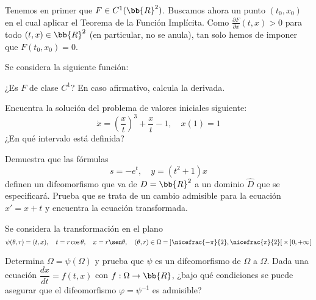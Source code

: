 \documentclass[12pt]{article}
\begin{document}
\begin{ejercicio}
\begin{description}
            Tenemos en primer que $F\in C^1(\bb{R}^2)$. Buscamos ahora un punto $(t_0, x_0)$ en el cual aplicar el Teorema de la Función Implícita. Como $\frac{\partial F}{\partial x} (t, x) > 0$ para todo $(t, x)\in\bb{R}^2$ (en particular, no se anula),
            tan solo hemos de imponer que $F(t_0, x_0) = 0$.
        \end{description}



    \end{ejercicio}


\begin{ejercicio}
    Se considera la siguiente función:
    \Func{F}{]0, +\infty[}{\bb{R}}{t}{\int_0^{\sqrt{t}} e^{s^2} ~ds}

    ¿Es $F$ de clase $C^1$? En caso afirmativo, calcula la derivada.
\end{ejercicio}


\begin{ejercicio}
    Encuentra la solución del problema de valores iniciales siguiente:
    \begin{equation*}
        \dot{x} = \left(\dfrac{x}{t}\right)^3 + \dfrac{x}{t} - 1, \quad x(1) = 1
    \end{equation*}
    ¿En qué intervalo está definida?
\end{ejercicio}


\begin{ejercicio}
    Demuestra que las fórmulas
    \begin{equation*}
        s = -e^t, \quad y = (t^2 + 1)x
    \end{equation*}
    definen un difeomorfismo que va de $D = \bb{R}^2$ a un dominio $\hat{D}$ que se especificará.
    Prueba que se trata de un cambio admisible para la ecuación $x' = x + t$ y encuentra la ecuación transformada.
\end{ejercicio}

\begin{ejercicio}
    Se considera la transformación en el plano
    \begin{equation*}
        \psi(\theta, r) = (t, x), \quad t = r\cos \theta, \quad x = r\sen \theta, \quad (\theta, r) \in \Omega = \left]\nicefrac{-\pi}{2}, \nicefrac{\pi}{2}\right[ \times \left]0, +\infty\right[
    \end{equation*}

    Determina $\Omega = \psi(\Omega)$ y prueba que $\psi$ es un difeomorfismo de $\Omega$ a $\Omega$. Dada una ecuación $\dfrac{dx}{dt} = f(t, x)$ con $f : \Omega \to \bb{R}$, ¿bajo qué condiciones se puede asegurar que el difeomorfismo $\varphi = \psi^{-1}$ es admisible?
\end{ejercicio}

    
\end{document}
